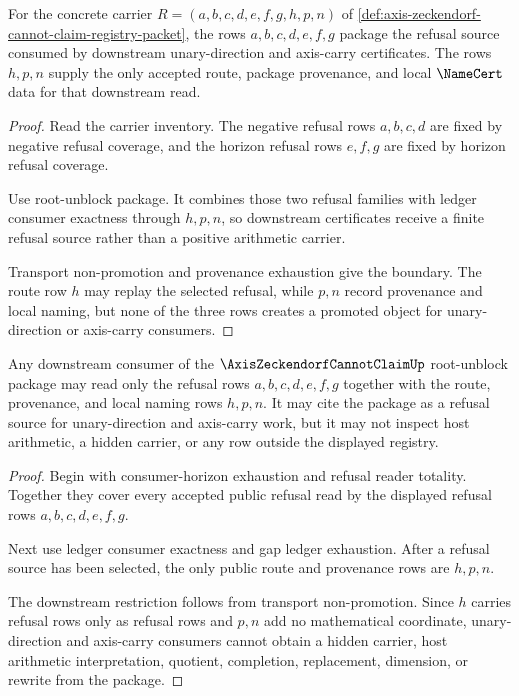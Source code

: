 \begin{theorem}
\label{thm:axis-zeckendorf-root-unblock-refusal-package}
For the concrete carrier $R=(a,b,c,d,e,f,g,h,p,n)$ of \autoref{def:axis-zeckendorf-cannot-claim-registry-packet}, the rows $a,b,c,d,e,f,g$ package the refusal source consumed by downstream unary-direction and axis-carry certificates. The rows $h,p,n$ supply the only accepted route, package provenance, and local $\NameCert$ data for that downstream read.
\end{theorem}
\begin{proof}
Read the carrier inventory. The negative refusal rows $a,b,c,d$ are fixed by negative refusal coverage, and the horizon refusal rows $e,f,g$ are fixed by horizon refusal coverage.

Use root-unblock package. It combines those two refusal families with ledger consumer exactness through $h,p,n$, so downstream certificates receive a finite refusal source rather than a positive arithmetic carrier.

Transport non-promotion and provenance exhaustion give the boundary. The route row $h$ may replay the selected refusal, while $p,n$ record provenance and local naming, but none of the three rows creates a promoted object for unary-direction or axis-carry consumers.
\end{proof}

\begin{theorem}
\label{thm:axis-zeckendorf-root-unblock-downstream-boundary}
Any downstream consumer of the $\AxisZeckendorfCannotClaimUp$ root-unblock package may read only the refusal rows $a,b,c,d,e,f,g$ together with the route, provenance, and local naming rows $h,p,n$. It may cite the package as a refusal source for unary-direction and axis-carry work, but it may not inspect host arithmetic, a hidden carrier, or any row outside the displayed registry.
\end{theorem}
\begin{proof}
Begin with consumer-horizon exhaustion and refusal reader totality. Together they cover every accepted public refusal read by the displayed refusal rows $a,b,c,d,e,f,g$.

Next use ledger consumer exactness and gap ledger exhaustion. After a refusal source has been selected, the only public route and provenance rows are $h,p,n$.

The downstream restriction follows from transport non-promotion. Since $h$ carries refusal rows only as refusal rows and $p,n$ add no mathematical coordinate, unary-direction and axis-carry consumers cannot obtain a hidden carrier, host arithmetic interpretation, quotient, completion, replacement, dimension, or rewrite from the package.
\end{proof}

